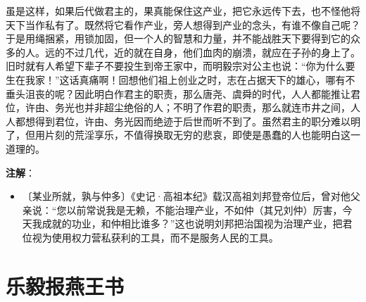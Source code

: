 \documentclass[12pt,UTF-8,openany,a4]{ctexbook}
\begin{document}
\begin{large}
    虽是这样，如果后代做君主的，果真能保住这产业，把它永远传下去，也不怪他将天下当作私有了。既然将它看作产业，旁人想得到产业的念头，有谁不像自己呢？于是用绳捆紧，用锁加固，但一个人的智慧和力量，并不能战胜天下要得到它的众多的人。远的不过几代，近的就在自身，他们血肉的崩溃，就应在子孙的身上了。旧时就有人希望下辈子不要投生到帝王家中，而明毅宗对公主也说：“你为什么要生在我家！”这话真痛啊！回想他们祖上创业之时，志在占据天下的雄心，哪有不垂头沮丧的呢？因此明白作君主的职责，那么唐尧、虞舜的时代，人人都能推让君位，许由、务光也并非超尘绝俗的人；不明了作君的职责，那么就连市井之间，人人都想得到君位，许由、务光因而绝迹于后世而听不到了。虽然君主的职分难以明了，但用片刻的荒淫享乐，不值得换取无穷的悲哀，即使是愚蠢的人也能明白这一道理的。
    

\end{large}


\newpage

\begin{Large}
   \noindent \textbf{注解}：
\end{Large}

\vspace{-1em}

\begin{itemize}
    \setlength\itemsep{-0.2em}
    \item〔某业所就，孰与仲多〕{\yiwen 《史记·高祖本纪》载汉高祖刘邦登帝位后，曾对他父亲说：“您以前常说我是无赖，不能治理产业，不如仲（其兄刘仲）厉害，今天我成就的功业，和仲相比谁多？”这也说明刘邦把治国视为治理产业，把君位视为使用权力营私获利的工具，而不是服务人民的工具。}
\end{itemize}

\chapter{乐毅报燕王书}
\end{document}
